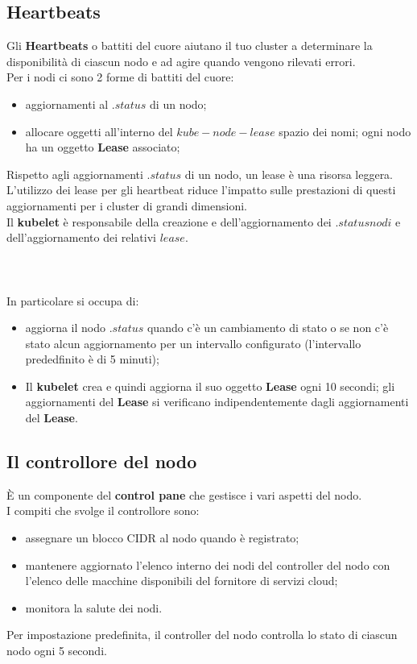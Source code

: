 \documentclass{article}
\begin{document}
\subsection{Heartbeats}
Gli \textbf{Heartbeats} o battiti del cuore  aiutano il tuo cluster a determinare la disponibilità di ciascun nodo e ad agire quando vengono rilevati errori.\\
Per i nodi ci sono 2 forme di battiti del cuore: 
\begin{itemize}
    \item aggiornamenti al
    $.status$ di un nodo;
    \item allocare oggetti all'interno del $kube-node-lease$ spazio dei nomi; ogni nodo ha un oggetto \textbf{Lease} associato;
\end{itemize}
Rispetto agli aggiornamenti $.status$ di un nodo, un lease è una risorsa leggera. L'utilizzo dei lease per gli heartbeat riduce l'impatto sulle prestazioni di questi aggiornamenti per i cluster di grandi dimensioni.\\
Il \textbf{kubelet} è responsabile della creazione e dell'aggiornamento dei $.status nodi$ e dell'aggiornamento dei relativi $lease$.\\\\\\\\
In particolare si occupa di: 
\begin{itemize}
    \item  aggiorna il nodo $.status$ quando c'è un cambiamento di stato o se non c'è stato alcun aggiornamento per un intervallo configurato (l'intervallo prededfinito è di 5 minuti);
    \item Il \textbf{kubelet} crea e quindi aggiorna il suo oggetto \textbf{Lease} ogni 10 secondi; gli aggiornamenti del \textbf{Lease} si verificano indipendentemente dagli aggiornamenti del \textbf{Lease}.
\end{itemize}
\subsection{Il controllore del nodo}
È un componente del \textbf{control pane} che gestisce i vari aspetti del nodo. \\
I compiti che svolge il controllore sono: 
\begin{itemize}
    \item assegnare un blocco CIDR al nodo quando è registrato;
    \item mantenere aggiornato l'elenco interno dei nodi del controller del nodo con l'elenco delle macchine disponibili del fornitore di servizi cloud;
    \item monitora la salute dei nodi.
\end{itemize}
Per impostazione predefinita, il controller del nodo controlla lo stato di ciascun nodo ogni 5 secondi. 
\end{document}
